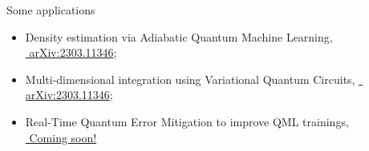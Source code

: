 \documentclass[8pt, xcolor={svgnames}, hyperref={linkcolor=black}]{beamer}
\begin{document}
\begin{frame}{Some applications}
  \small
  \begin{multicols}{2}
  \begin{itemize}
  \item<2,3,4>[-] Density estimation via Adiabatic Quantum Machine Learning,\\
  \href{https://arxiv.org/abs/2303.11346}{\faBook\,\,arXiv:2303.11346};
  \item<3,4>[-] Multi-dimensional integration using Variational Quantum Circuits,
  \href{https://arxiv.org/abs/2303.11346}{\faBook\,\,arXiv:2303.11346};
  \item<4>[-] Real-Time Quantum Error Mitigation to improve QML trainings,\\
  \href{https://arxiv.org/abs/2303.11346}{\faBook\,\,Coming soon!}
  \end{itemize}
    \begin{figure}
    \end{figure}
    \begin{figure}
    \end{figure}
    \end{multicols}
\end{frame}
\end{document}
